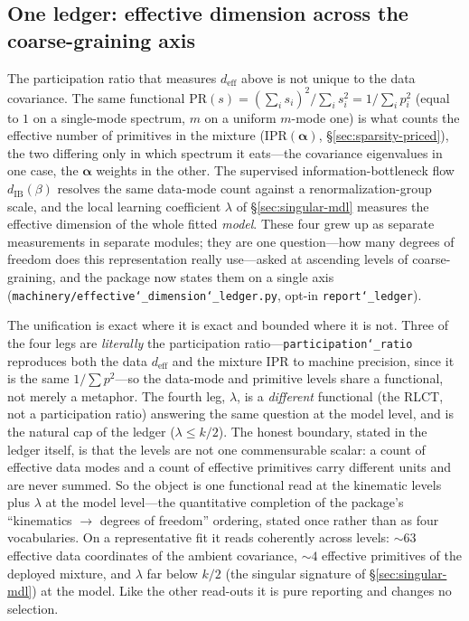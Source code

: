 \documentclass[11pt]{article}
\newcommand{\allowbreakhere}{\discretionary{}{}{}}
\newcommand{\code}[1]{\texttt{\def\_{\char`_\allowbreakhere}#1}}
\newcommand{\alphapar}{\bm{\alpha}}
\begin{document}
\subsection{One ledger: effective dimension across the coarse-graining axis}
\label{sec:ledger}

The participation ratio that measures $d_{\mathrm{eff}}$ above is not unique to the data covariance. The
same functional $\mathrm{PR}(s)=(\sum_i s_i)^2/\sum_i s_i^2=1/\sum_i p_i^2$ (equal to $1$ on a
single-mode spectrum, $m$ on a uniform $m$-mode one) is what counts the effective number of primitives in
the mixture ($\mathrm{IPR}(\alphapar)$, \S\ref{sec:sparsity-priced}), the two differing only in which spectrum it
eats---the covariance eigenvalues in one case, the $\alphapar$ weights in the other. The supervised
information-bottleneck flow $d_{\mathrm{IB}}(\beta)$ resolves the same data-mode count against a
renormalization-group scale, and the local learning coefficient $\lambda$ of \S\ref{sec:singular-mdl}
measures the effective dimension of the whole fitted \emph{model}. These four grew up as separate
measurements in separate modules; they are one question---how many degrees of freedom does this
representation really use---asked at ascending levels of coarse-graining, and the package now states them
on a single axis (\code{machinery/effective\_dimension\_ledger.py}, opt-in \code{report\_ledger}).

The unification is exact where it is exact and bounded where it is not. Three of the four legs are
\emph{literally} the participation ratio---\code{participation\_ratio} reproduces both the data $d_{\mathrm{eff}}$
and the mixture $\mathrm{IPR}$ to machine precision, since it is the same $1/\sum p^2$---so the data-mode
and primitive levels share a functional, not merely a metaphor. The fourth leg, $\lambda$, is a
\emph{different} functional (the RLCT, not a participation ratio) answering the same question at the model
level, and is the natural cap of the ledger ($\lambda\le k/2$). The honest boundary, stated in the ledger
itself, is that the levels are not one commensurable scalar: a count of effective data modes and a count
of effective primitives carry different units and are never summed. So the object is one functional read
at the kinematic levels plus $\lambda$ at the model level---the quantitative completion of the
package's ``kinematics $\to$ degrees of freedom'' ordering, stated once rather than as four vocabularies.
On a representative fit it reads coherently across levels: ${\sim}63$ effective data coordinates of the
ambient covariance, ${\sim}4$ effective primitives of the deployed mixture, and $\lambda$ far below $k/2$
(the singular signature of \S\ref{sec:singular-mdl}) at the model. Like the other read-outs it is pure
reporting and changes no selection.
\end{document}
